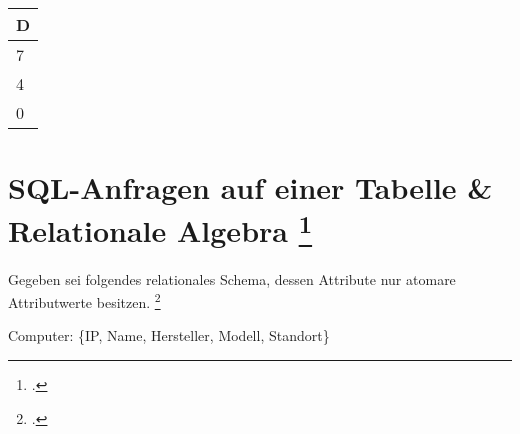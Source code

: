 \documentclass{lehramt-informatik}
\begin{document}
\begin{enumerate}
\begin{antwort}
\begin{minipage}[t]{6cm}
\bigskip
\begin{tabular}{l}
D \\\hline
7 \\
4 \\
0 \\
\end{tabular}
\end{minipage}
\end{antwort}
\end{enumerate}

%

\section{SQL-Anfragen auf einer Tabelle \& Relationale Algebra
\footcite[Staatsexamen Softwaretechnologie/Datenbanksysteme, Thema Nr. 1,
Teilaufgabe II, Aufgabe 1, Herbst 2015 Realschule]{examen:46116:2015:09}
}

Gegeben sei folgendes relationales Schema, dessen Attribute nur atomare
Attributwerte besitzen.
\footcite{db:ab:2}

Computer: \{IP, Name, Hersteller, Modell, Standort\}
\end{document}
